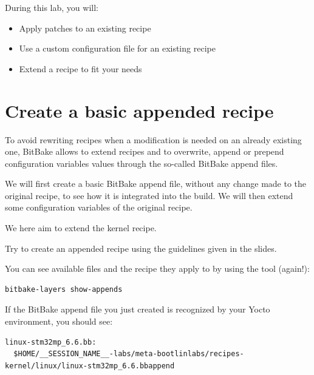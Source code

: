 
During this lab, you will:
\begin{itemize}
  \item Apply patches to an existing recipe
  \item Use a custom configuration file for an existing recipe
  \item Extend a recipe to fit your needs
\end{itemize}

\section{Create a basic appended recipe}

To avoid rewriting recipes when a modification is needed on an already existing
one, BitBake allows to extend recipes and to overwrite, append or prepend
configuration variables values through the so-called BitBake append files.

We will first create a basic BitBake append file, without any change made
to the original recipe, to see how it is integrated into the build. We will then
extend some configuration variables of the original recipe.





We here aim to extend the {\tt \linuxrecipename{}} kernel recipe.

Try to create an appended recipe using the guidelines given in the slides.

You can see available  files and the recipe they apply to by
using the  tool (again!):
\begin{verbatim}
bitbake-layers show-appends
\end{verbatim}

If the BitBake append file you just created is recognized by your Yocto
environment, you should see:
\if{}
\begin{verbatim}
linux-stm32mp_6.6.bb:
  $HOME/__SESSION_NAME__-labs/meta-bootlinlabs/recipes-kernel/linux/linux-stm32mp_6.6.bbappend
\end{verbatim}
\fi

